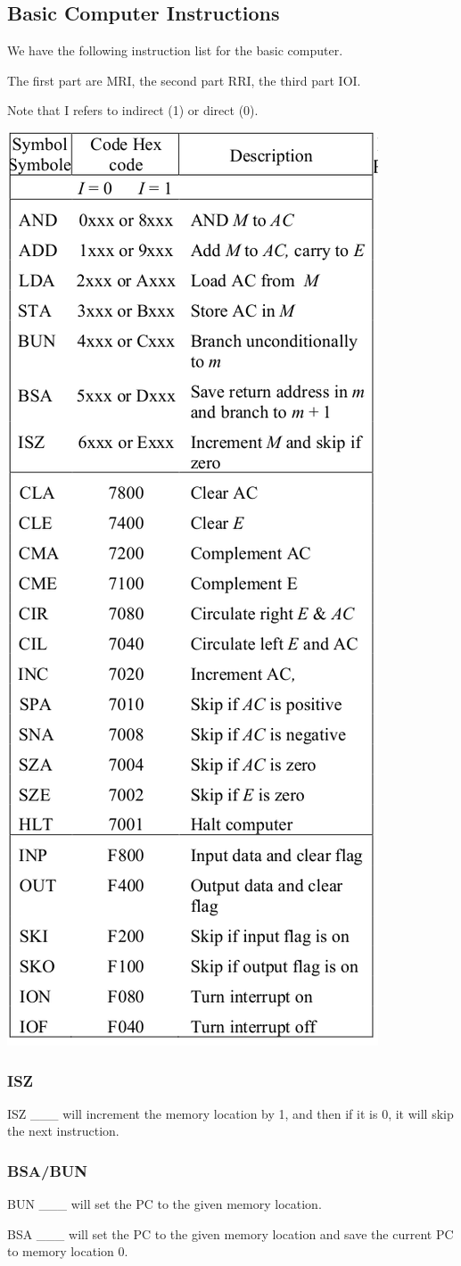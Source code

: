 \documentclass[12pt,letterpaper]{article} \usepackage{amsmath} \usepackage{graphicx} \usepackage[margin=1in]{geometry} \usepackage{longtable}  \usepackage{amssymb}
\begin{document}
			\subsection{Basic Computer Instructions}
			We have the following instruction list for the basic computer. 
			
			The first part are MRI, the second part RRI, the third part IOI.

			Note that I refers to indirect (1) or direct (0). 
			\begin{center}
				\includegraphics[width=0.4\linewidth]{instructions}
			\end{center}
			
			
				\subsubsection{ISZ}
				ISZ \_\_\_ will increment the memory location by 1, and then if it is 0, it will skip the next instruction.
				
				\subsubsection{BSA/BUN}
				BUN \_\_\_ will set the PC to the given memory location.
				
				BSA \_\_\_ will set the PC to the given memory location and save the current PC to memory location 0.
			
\end{document}
